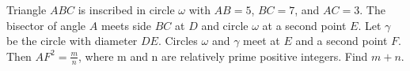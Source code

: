 Triangle $ABC$ is inscribed in circle $\omega$ with $AB = 5$, $BC = 7$, and $AC = 3$. The bisector of angle $A$ meets side $BC$ at $D$ and circle $\omega$ at a second point $E$. Let $\gamma$ be the circle with diameter $DE$. Circles $\omega$ and $\gamma$ meet at $E$ and a second point $F$. Then $AF^2 = \frac mn$, where m and n are relatively prime positive integers. Find $m + n$.